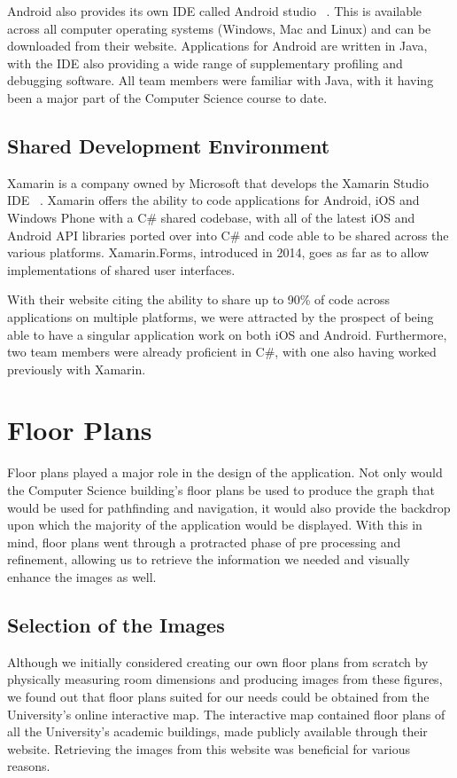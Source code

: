 \documentclass[12pt,a4paper]{report}
\begin{document}
Android also provides its own IDE called Android studio ~\cite{androidStudio}. This is available across all computer operating systems (Windows, Mac and Linux) and can be downloaded from their website. Applications for Android are written in Java, with the IDE also providing a wide range of supplementary profiling and debugging software. All team members were familiar with Java, with it having been a major part of the Computer Science course to date.

\subsection{Shared Development Environment}

Xamarin is a company owned by Microsoft that develops the Xamarin Studio IDE ~\cite{xamarin}. Xamarin offers the ability to code applications for Android, iOS and Windows Phone with a C\# shared codebase, with all of the latest iOS and Android API libraries ported over into C\# and code able to be shared across the various platforms. Xamarin.Forms, introduced in 2014, goes as far as to allow implementations of shared user interfaces.

With their website citing the ability to share up to 90\% of code across applications on multiple platforms, we were attracted by the prospect of being able to have a singular application work on both iOS and Android. Furthermore, two team members were already proficient in C\#, with one also having worked previously with Xamarin.

\section{Floor Plans}
    
Floor plans played a major role in the design of the application. Not only would the Computer Science building's floor plans be used to produce the graph that would be used for pathfinding and navigation, it would also provide the backdrop upon which the majority of the application would be displayed. With this in mind, floor plans went through a protracted phase of pre processing and refinement, allowing us to retrieve the information we needed and visually enhance the images as well.

\subsection{Selection of the Images}

Although we initially considered creating our own floor plans from scratch by physically measuring room dimensions and producing images from these figures, we found out that floor plans suited for our needs could be obtained from the University's online interactive map. The interactive map contained floor plans of all the University's academic buildings, made publicly available through their website. Retrieving the images from this website was beneficial for various reasons.
\end{document}
